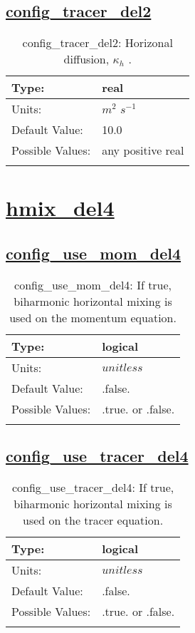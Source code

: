 \subsection[config\_tracer\_del2]{\hyperref[sec:nm_tab_hmix_del2]{config\_tracer\_del2}}
\label{subsec:nm_sec_config_tracer_del2}
\begin{center}
\begin{longtable}{| p{2.0in} | p{4.0in} |}
    \hline
    Type: & real \\
    \hline
    Units: & $m^2$ $s^{-1}$ \\
    \hline
    Default Value: & 10.0 \\
    \hline
    Possible Values: & any positive real \\
    \hline
    \caption{config\_tracer\_del2:  Horizonal diffusion,  $\kappa_h$ .}
\end{longtable}
\end{center}
\section[hmix\_del4]{\hyperref[sec:nm_tab_hmix_del4]{hmix\_del4}}
\label{sec:nm_sec_hmix_del4}
\subsection[config\_use\_mom\_del4]{\hyperref[sec:nm_tab_hmix_del4]{config\_use\_mom\_del4}}
\label{subsec:nm_sec_config_use_mom_del4}
\begin{center}
\begin{longtable}{| p{2.0in} | p{4.0in} |}
    \hline
    Type: & logical \\
    \hline
    Units: & $unitless$ \\
    \hline
    Default Value: & .false. \\
    \hline
    Possible Values: & .true. or .false. \\
    \hline
    \caption{config\_use\_mom\_del4: If true, biharmonic horizontal mixing is used on the momentum equation.}
\end{longtable}
\end{center}
\subsection[config\_use\_tracer\_del4]{\hyperref[sec:nm_tab_hmix_del4]{config\_use\_tracer\_del4}}
\label{subsec:nm_sec_config_use_tracer_del4}
\begin{center}
\begin{longtable}{| p{2.0in} | p{4.0in} |}
    \hline
    Type: & logical \\
    \hline
    Units: & $unitless$ \\
    \hline
    Default Value: & .false. \\
    \hline
    Possible Values: & .true. or .false. \\
    \hline
    \caption{config\_use\_tracer\_del4: If true, biharmonic horizontal mixing is used on the tracer equation.}
\end{longtable}
\end{center}
